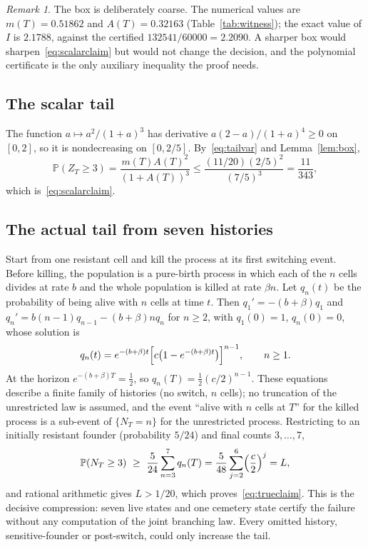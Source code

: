 \documentclass[11pt,a4paper]{article}
\theoremstyle{plain}
\theoremstyle{definition}
\theoremstyle{remark}
\newtheorem{remark}[theorem]{Remark}
\newcommand{\PP}{\mathbb P}
\begin{document}
\begin{remark}
The box is deliberately coarse. The numerical values are $m(T)=0.51862$ and $A(T)=0.32163$ (Table~\ref{tab:witness}); the exact value of $I$ is $2.1788$, against the certified $132541/60000=2.2090$. A sharper box would sharpen~\eqref{eq:scalarclaim} but would not change the decision, and the polynomial certificate is the only auxiliary inequality the proof needs.
\end{remark}

\subsection{The scalar tail}
The function $a\mapsto a^2/(1+a)^3$ has derivative $a(2-a)/(1+a)^4\ge0$ on $[0,2]$, so it is nondecreasing on $[0,2/5]$. By~\eqref{eq:tailvar} and Lemma~\ref{lem:box},
\begin{equation}\label{eq:scalartail}
\PP(Z_T\ge3)=\frac{m(T)A(T)^2}{(1+A(T))^3}\le\frac{(11/20)(2/5)^2}{(7/5)^3}=\frac{11}{343},
\end{equation}
which is~\eqref{eq:scalarclaim}.

\subsection{The actual tail from seven histories}\label{sec:actualtail}
Start from one resistant cell and kill the process at its first switching event. Before killing, the population is a pure-birth process in which each of the $n$ cells divides at rate $b$ and the whole population is killed at rate $\beta n$. Let $q_n(t)$ be the probability of being alive with $n$ cells at time $t$. Then $q_1'=-(b+\beta)q_1$ and $q_n'=b(n-1)q_{n-1}-(b+\beta)nq_n$ for $n\ge2$, with $q_1(0)=1$, $q_n(0)=0$, whose solution is
\begin{equation}\label{eq:killed}
q_n(t)=e^{-(b+\beta)t}\Bigl[c\bigl(1-e^{-(b+\beta)t}\bigr)\Bigr]^{n-1},\qquad n\ge1 .
\end{equation}
At the horizon $e^{-(b+\beta)T}=\frac12$, so $q_n(T)=\frac12(c/2)^{n-1}$. These equations describe a finite family of histories (no switch, $n$ cells); no truncation of the unrestricted law is assumed, and the event ``alive with $n$ cells at $T$'' for the killed process is a sub-event of $\{N_T=n\}$ for the unrestricted process. Restricting to an initially resistant founder (probability $5/24$) and final counts $3,\dots,7$,
\[
\PP(N_T\ge3)\ \ge\ \frac5{24}\sum_{n=3}^{7}q_n(T)=\frac5{48}\sum_{j=2}^{6}\Bigl(\frac c2\Bigr)^j=L ,
\]
and rational arithmetic gives $L>1/20$, which proves~\eqref{eq:trueclaim}. This is the decisive compression: seven live states and one cemetery state certify the failure without any computation of the joint branching law. Every omitted history, sensitive-founder or post-switch, could only increase the tail.
\end{document}
